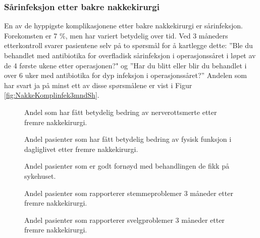 \documentclass [norsk,a4paper,twoside]{article}\usepackage[]{graphicx}\usepackage[]{color}
\begin{document}
\subsubsection{Sårinfeksjon etter bakre nakkekirurgi}
En av de hyppigste komplikasjonene etter bakre nakkekirurgi er  sårinfeksjon. Forekomsten er 7 \%, men har variert betydelig over tid. Ved  3 måneders etterkontroll svarer pasientene selv på to spørsmål  for å kartlegge dette: ''Ble du behandlet med antibiotika for overfladisk sårinfeksjon i operasjonssåret i løpet av de 4 første ukene etter operasjonen?" og ''Har du blitt eller blir du behandlet i over 6 uker med antibiotika for dyp infeksjon i operasjonssåret?''   Andelen som har svart ja på minst ett av disse spørsmålene er vist i Figur \ref{fig:NakkeKomplinfek3mndSh}.  



\begin{figure}[ht]
\caption{\label{fig:NakkeNRSsmerteArmEndr12mndUmFSh} Andel som har fått betydelig bedring av nerverottsmerte  etter fremre nakkekirurgi.}
\end{figure}

\begin{figure}[ht]
\caption{\label{fig:NakkeNDIendr12mndUmFSh} Andel pasienter som har fått betydelig bedring av fysisk funksjon i dagliglivet etter fremre nakkekirurgi.}
\end{figure}

\begin{figure}[ht]
\caption{\label{fig:NakkeFornoydBeh12mndFremSh} Andel pasienter som er godt fornøyd med behandlingen de fikk på sykehuset.}
\end{figure}

\begin{figure}[ht]
\caption{\label{fig:NakkeStemme3mndSh} Andel pasienter som rapporterer stemmeproblemer 3 måneder etter fremre nakkekirurgi.}
\end{figure}

\begin{figure}[ht]
\caption{\label{fig:NakkeSvelg3mndSh} Andel pasienter som rapporterer svelgproblemer 3 måneder etter fremre nakkekirurgi.}
\end{figure}
\end{document}

